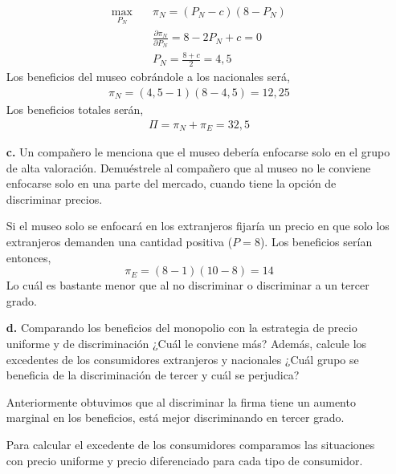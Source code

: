 \documentclass{exam}
\begin{document}
\begin{itemize}
\begin{solution}
        \begin{align*}
            \max_{P_N} \quad & \pi_N = (P_N-c)(8-P_N) \\
            & \frac{\partial \pi_N}{\partial P_N} = 8-2P_N + c = 0 \\
            & P_N = \frac{8+c}{2} = 4,5
        \end{align*}
        Los beneficios del museo cobrándole a los nacionales será,
        \begin{align*}
            \pi_N = (4,5-1)(8-4,5) = 12,25
        \end{align*}
        Los beneficios totales serán,
        \begin{align*}
            \Pi = \pi_N + \pi_E = 32,5
        \end{align*}
    \end{solution}
    \item[\textbf{c.}] Un compañero le menciona que el museo debería enfocarse solo en el grupo de alta valoración. Demuéstrele al compañero que al museo no le conviene enfocarse solo en una parte del mercado, cuando tiene la opción de discriminar precios. 
    \begin{solution}
        Si el museo solo se enfocará en los extranjeros fijaría un precio en que solo los extranjeros demanden una cantidad positiva ($P = 8$). Los beneficios serían entonces,
        \begin{equation*}
            \pi_E = (8-1)(10-8) = 14
        \end{equation*}
        Lo cuál es bastante menor que al no discriminar o discriminar a un tercer grado. 
    \end{solution}
    \item[\textbf{d.}] Comparando los beneficios del monopolio con la estrategia de precio uniforme y de discriminación ¿Cuál le conviene más? Además, calcule los excedentes de los consumidores extranjeros y nacionales ¿Cuál grupo se beneficia de la discriminación de tercer y cuál se perjudica?
    \begin{solution}
        Anteriormente obtuvimos que al discriminar la firma tiene un aumento marginal en los beneficios, está mejor discriminando en tercer grado. 

        Para calcular el excedente de los consumidores comparamos las situaciones con precio uniforme y precio diferenciado para cada tipo de consumidor. 


\end{solution}
\end{itemize}
\end{document}
